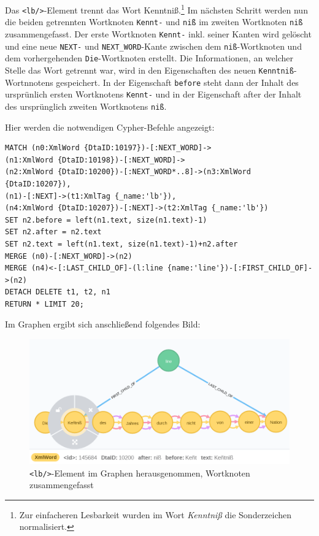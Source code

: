 \documentclass[12pt,ngerman,]{article}
\begin{document}
Das \texttt{\textless{}lb/\textgreater{}}-Element trennt das Wort
Kenntniß.\footnote{Zur einfacheren Lesbarkeit wurden im Wort
  \emph{Kenntniß} die Sonderzeichen normalisiert.} Im nächsten Schritt
werden nun die beiden getrennten Wortknoten \texttt{Kennt-} und
\texttt{niß} im zweiten Wortknoten \texttt{niß} zusammengefasst. Der
erste Wortknoten \texttt{Kennt-} inkl. seiner Kanten wird gelöscht und
eine neue \texttt{NEXT-} und \texttt{NEXT\_WORD}-Kante zwischen dem
\texttt{niß}-Wortknoten und dem vorhergehenden \texttt{Die}-Wortknoten
erstellt. Die Informationen, an welcher Stelle das Wort getrennt war,
wird in den Eigenschaften des neuen \texttt{Kenntniß}-Wortnnotens
gespeichert. In der Eigenschaft \texttt{before} steht dann der Inhalt
des ursprünlich ersten Wortknotens \texttt{Kennt-} und in der
Eigenschaft after der Inhalt des ursprünglich zweiten Wortknotens
\texttt{niß}.

Hier werden die notwendigen Cypher-Befehle angezeigt:

\begin{verbatim}
MATCH (n0:XmlWord {DtaID:10197})-[:NEXT_WORD]->
(n1:XmlWord {DtaID:10198})-[:NEXT_WORD]->
(n2:XmlWord {DtaID:10200})-[:NEXT_WORD*..8]->(n3:XmlWord {DtaID:10207}),
(n1)-[:NEXT]->(t1:XmlTag {_name:'lb'}),
(n4:XmlWord {DtaID:10207})-[:NEXT]->(t2:XmlTag {_name:'lb'})
SET n2.before = left(n1.text, size(n1.text)-1)
SET n2.after = n2.text
SET n2.text = left(n1.text, size(n1.text)-1)+n2.after
MERGE (n0)-[:NEXT_WORD]->(n2)
MERGE (n4)<-[:LAST_CHILD_OF]-(l:line {name:'line'})-[:FIRST_CHILD_OF]->(n2)
DETACH DELETE t1, t2, n1
RETURN * LIMIT 20;
\end{verbatim}

Im Graphen ergibt sich anschließend folgendes Bild:

\begin{figure}
\centering
\includegraphics{Bilder/TEI2Graph/lb-Trennung-rausgenommen2.png}
\caption{\texttt{\textless{}lb/\textgreater{}}-Element im Graphen
herausgenommen, Wortknoten zusammengefasst}
\end{figure}
\end{document}

